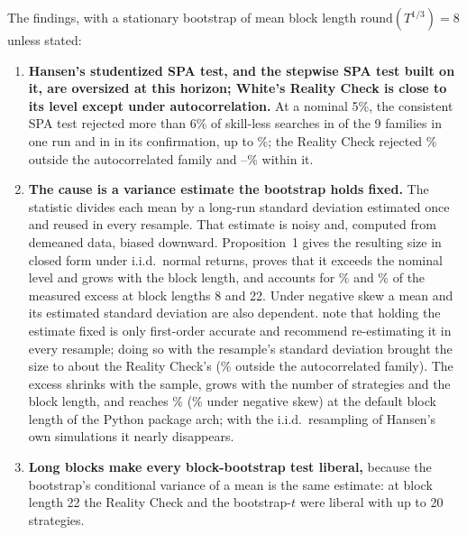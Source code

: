 The findings, with a stationary bootstrap of mean block length $\mathrm{round}(T^{1/3})=8$ unless stated:
\begin{enumerate}
  \item \textbf{Hansen's studentized SPA test, and the stepwise SPA test built on it, are oversized at this horizon; White's Reality Check is close to its level except under autocorrelation.} At a nominal 5\%, the consistent SPA test rejected more than 6\% of skill-less searches in  of the 9 families in one run and in  in its confirmation, up to \%; the Reality Check rejected \% outside the autocorrelated family and --\% within it.
  \item \textbf{The cause is a variance estimate the bootstrap holds fixed.} The statistic divides each mean by a long-run standard deviation estimated once and reused in every resample. That estimate is noisy and, computed from demeaned data, biased downward. Proposition~1 gives the resulting size in closed form under i.i.d.\ normal returns, proves that it exceeds the nominal level and grows with the block length, and accounts for \% and \% of the measured excess at block lengths 8 and 22. Under negative skew a mean and its estimated standard deviation are also dependent. \citet{romano2005stepwise} note that holding the estimate fixed is only first-order accurate and recommend re-estimating it in every resample; doing so with the resample's standard deviation brought the size to about the Reality Check's (\% outside the autocorrelated family). The excess shrinks with the sample, grows with the number of strategies and the block length, and reaches \% (\% under negative skew) at the default block length of the Python package arch; with the i.i.d.\ resampling of Hansen's own simulations it nearly disappears.
  \item \textbf{Long blocks make every block-bootstrap test liberal,} because the bootstrap's conditional variance of a mean is the same estimate: at block length 22 the Reality Check and the bootstrap-$t$ were liberal with up to 20 strategies.

\end{enumerate}
